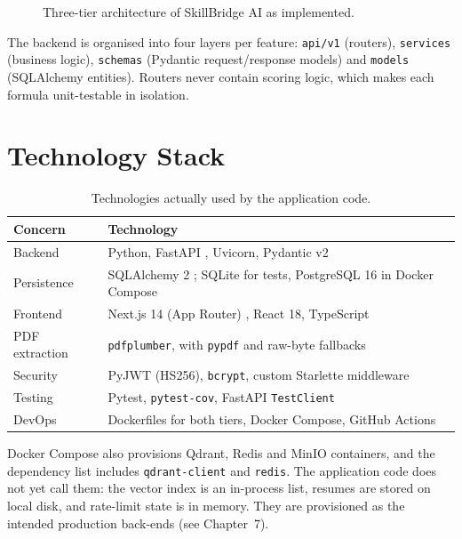 \documentclass[openany]{tietreport}
\newcommand{\code}[1]{\texttt{\small #1}}
\begin{document}
\begin{figure}[h]
\caption{Three-tier architecture of SkillBridge AI as implemented.}
\label{fig:arch}
\end{figure}

The backend is organised into four layers per feature: \code{api/v1} (routers), \code{services} (business logic), \code{schemas} (Pydantic request/response models) and \code{models} (SQLAlchemy entities). Routers never contain scoring logic, which makes each formula unit-testable in isolation.

\section{Technology Stack}
\begin{table}[h]
\centering\small
\begin{tabularx}{\textwidth}{@{}l>{\raggedright\arraybackslash}X@{}}
\toprule
\textbf{Concern} & \textbf{Technology} \\
\midrule
Backend & Python, FastAPI \cite{fastapi}, Uvicorn, Pydantic v2 \\
Persistence & SQLAlchemy 2 \cite{sqlalchemy}; SQLite for tests, PostgreSQL 16 in Docker Compose \\
Frontend & Next.js 14 (App Router) \cite{nextjs}, React 18, TypeScript \\
PDF extraction & \code{pdfplumber}, with \code{pypdf} and raw-byte fallbacks \\
Security & PyJWT (HS256), \code{bcrypt}, custom Starlette middleware \\
Testing & Pytest, \code{pytest-cov}, FastAPI \code{TestClient} \\
DevOps & Dockerfiles for both tiers, Docker Compose, GitHub Actions \\
\bottomrule
\end{tabularx}
\caption{Technologies actually used by the application code.}
\label{tab:stack}
\end{table}

\noindent Docker Compose also provisions Qdrant, Redis and MinIO containers, and the dependency list includes \code{qdrant-client} and \code{redis}. The application code does not yet call them: the vector index is an in-process list, resumes are stored on local disk, and rate-limit state is in memory. They are provisioned as the intended production back-ends (see Chapter~7).
\end{document}

